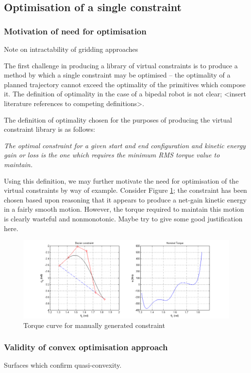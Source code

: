 \subsection{Optimisation of a single constraint}
\subsubsection{Motivation of need for optimisation}
Note on intractability of gridding approaches

The first challenge in producing a library of virtual constraints is to produce a method by which a single constraint may be optimised -- the optimality of a planned trajectory cannot exceed the optimality of the primitives which compose it. The definition of optimality in the case of a bipedal robot is not clear; {\color{red}<insert literature references to competing definitions>}.

The definition of optimality chosen for the purposes of producing the virtual constraint library is as follows:

\emph{The optimal constraint for a given start and end configuration and kinetic energy gain or loss is the one which requires the minimum RMS torque value to maintain.}

Using this definition, we may further motivate the need for optimisation of the virtual constraints by way of example. Consider Figure \ref{fig:manualgen}; the constraint has been chosen based upon reasoning that it appears to produce a net-gain kinetic energy in a fairly smooth motion. However, the torque required to maintain this motion is clearly wasteful and nonmonotonic. {\color{red} Maybe try to give some good justification here.}

\begin{figure}
	\centering
	\includegraphics[width=0.9\linewidth]{4VirtConstLib/manualgen.png}
	\caption{Torque curve for manually generated constraint}
	\label{fig:manualgen}
\end{figure}

\subsubsection{Validity of convex optimisation approach}
Surfaces which confirm quasi-convexity.

